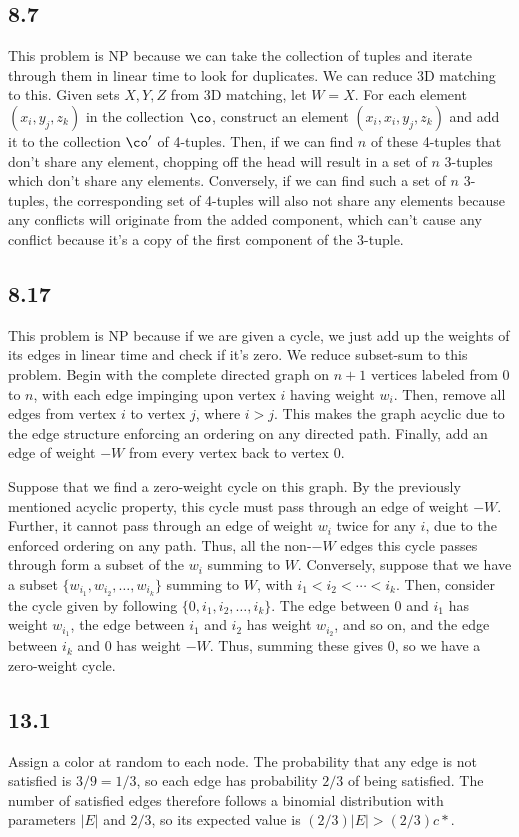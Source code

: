 \documentclass{article}
\begin{document}
\subsection*{8.7}
This problem is NP because we can take the collection of tuples and iterate through them in linear time to look for duplicates. We can reduce 3D matching to this. Given sets $X,Y,Z$ from 3D matching, let $W=X$. For each element $(x_i,y_j,z_k)$ in the collection $\co$, construct an element $(x_i,x_i,y_j,z_k)$ and add it to the collection $\co'$ of 4-tuples. Then, if we can find $n$ of these 4-tuples that don't share any element, chopping off the head will result in a set of $n$ 3-tuples which don't share any elements. Conversely, if we can find such a set of $n$ 3-tuples, the corresponding set of 4-tuples will also not share any elements because any conflicts will originate from the added component, which can't cause any conflict because it's a copy of the first component of the 3-tuple.
\subsection*{8.17}
This problem is NP because if we are given a cycle, we just add up the weights of its edges in linear time and check if it's zero. We reduce subset-sum to this problem. Begin with the complete directed graph on $n+1$ vertices labeled from $0$ to $n$, with each edge impinging upon vertex $i$ having weight $w_i$. Then, remove all edges from vertex $i$ to vertex $j$, where $i>j$. This makes the graph acyclic due to the edge structure enforcing an ordering on any directed path. Finally, add an edge of weight $-W$ from every vertex back to vertex $0$. 

Suppose that we find a zero-weight cycle on this graph. By the previously mentioned acyclic property, this cycle must pass through an edge of weight $-W$. Further, it cannot pass through an edge of weight $w_i$ twice for any $i$, due to the enforced ordering on any path. Thus, all the non-$-W$ edges this cycle passes through form a subset of the $w_i$ summing to $W$. Conversely, suppose that we have a subset $\{w_{i_1},w_{i_2},\ldots,w_{i_k}\}$ summing to $W$, with $i_1<i_2<\cdots<i_k$. Then, consider the cycle given by following $\{0,i_1,i_2,\ldots,i_k\}$. The edge between $0$ and $i_1$ has weight $w_{i_1}$, the edge between $i_1$ and $i_2$ has weight $w_{i_2}$, and so on, and the edge between $i_k$ and $0$ has weight $-W$. Thus, summing these gives $0$, so we have a zero-weight cycle.
\subsection*{13.1}
Assign a color at random to each node. The probability that any edge is not satisfied is $3/9=1/3$, so each edge has probability $2/3$ of being satisfied. The number of satisfied edges therefore follows a binomial distribution with parameters $|E|$ and $2/3$, so its expected value is $(2/3)|E|>(2/3)c*$. 
\end{document}

